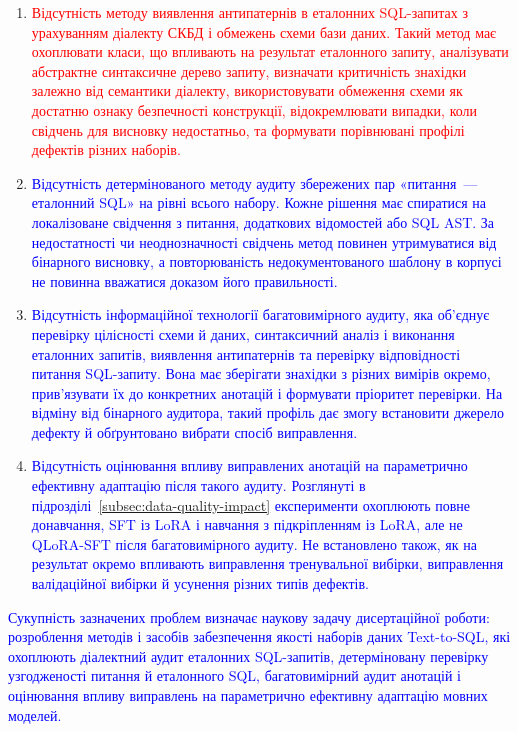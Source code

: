 \documentclass[a4paper,14pt,oneside]{extreport}
\begin{document}
\begin{enumerate}
\item \textcolor{red}{Відсутність методу виявлення антипатернів в еталонних SQL-запитах з урахуванням діалекту СКБД і обмежень схеми бази даних. Такий метод має охоплювати класи, що впливають на результат еталонного запиту, аналізувати абстрактне синтаксичне дерево запиту, визначати критичність знахідки залежно від семантики діалекту, використовувати обмеження схеми як достатню ознаку безпечності конструкції, відокремлювати випадки, коли свідчень для висновку недостатньо, та формувати порівнювані профілі дефектів різних наборів.}

\item \textcolor{blue}{Відсутність детермінованого методу аудиту збережених пар «питання~--- еталонний SQL» на рівні всього набору. Кожне рішення має спиратися на локалізоване свідчення з питання, додаткових відомостей або SQL AST. За недостатності чи неоднозначності свідчень метод повинен утримуватися від бінарного висновку, а повторюваність недокументованого шаблону в корпусі не повинна вважатися доказом його правильності.}

\item \textcolor{blue}{Відсутність інформаційної технології багатовимірного аудиту, яка об'єднує перевірку цілісності схеми й даних, синтаксичний аналіз і виконання еталонних запитів, виявлення антипатернів та перевірку відповідності питання SQL-запиту. Вона має зберігати знахідки з різних вимірів окремо, прив'язувати їх до конкретних анотацій і формувати пріоритет перевірки. На відміну від бінарного аудитора, такий профіль дає змогу встановити джерело дефекту й обґрунтовано вибрати спосіб виправлення.}

\item \textcolor{blue}{Відсутність оцінювання впливу виправлених анотацій на параметрично ефективну адаптацію після такого аудиту. Розглянуті в підрозділі~\ref{subsec:data-quality-impact} експерименти охоплюють повне донавчання, SFT із LoRA і навчання з підкріпленням із LoRA, але не QLoRA-SFT після багатовимірного аудиту. Не встановлено також, як на результат окремо впливають виправлення тренувальної вибірки, виправлення валідаційної вибірки й усунення різних типів дефектів.}
\end{enumerate}

\textcolor{blue}{Сукупність зазначених проблем визначає наукову задачу дисертаційної роботи: розроблення методів і засобів забезпечення якості наборів даних Text-to-SQL, які охоплюють діалектний аудит еталонних SQL-запитів, детерміновану перевірку узгодженості питання й еталонного SQL, багатовимірний аудит анотацій і оцінювання впливу виправлень на параметрично ефективну адаптацію мовних моделей.}
\end{document}
